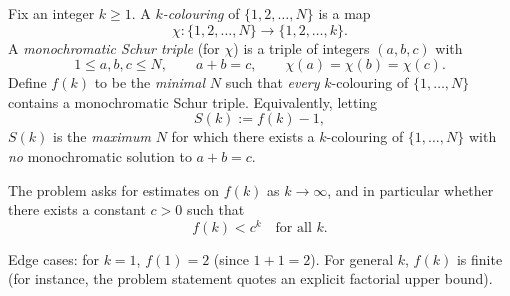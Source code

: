 Fix an integer $k\ge 1$. A \emph{$k$-colouring} of $\{1,2,\dots,N\}$ is a map
\[\chi:\{1,2,\dots,N\}\to\{1,2,\dots,k\}.\]
A \emph{monochromatic Schur triple} (for $\chi$) is a triple of integers $(a,b,c)$ with
\[1\le a,b,c\le N,\qquad a+b=c,\qquad \chi(a)=\chi(b)=\chi(c).\]
Define $f(k)$ to be the \emph{minimal} $N$ such that \emph{every} $k$-colouring of $\{1,\dots,N\}$ contains a monochromatic Schur triple.
Equivalently, letting
\[S(k):=f(k)-1,\]
$S(k)$ is the \emph{maximum} $N$ for which there exists a $k$-colouring of $\{1,\dots,N\}$ with \emph{no} monochromatic solution to $a+b=c$.

The problem asks for estimates on $f(k)$ as $k\to\infty$, and in particular whether there exists a constant $c>0$ such that
\[f(k) < c^k\quad\text{for all }k.\]

Edge cases: for $k=1$, $f(1)=2$ (since $1+1=2$). For general $k$, $f(k)$ is finite (for instance, the problem statement quotes an explicit factorial upper bound).
